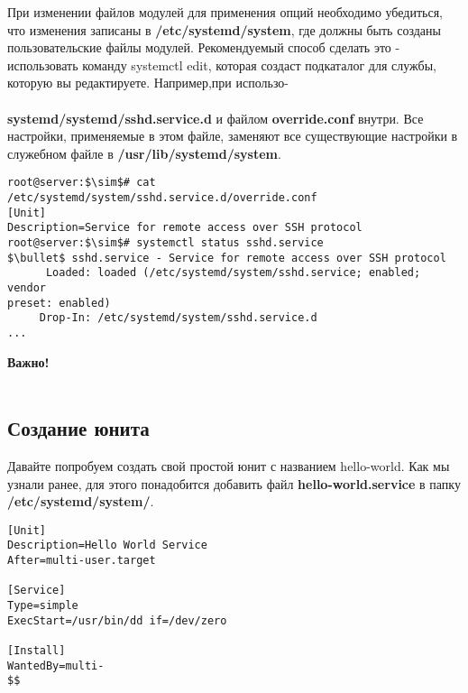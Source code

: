 \documentclass[14pt, a4paper]{article}
\begin{document}
\vspace{0.2cm}

При изменении файлов модулей для применения опций необходимо убедиться, что изменения
записаны в \textbf{/etc/systemd/system}, где должны быть созданы пользовательские файлы модулей.
Рекомендуемый способ сделать это - использовать команду \colorbox{backcolour}{systemctl edit}, которая создаст
подкаталог для службы, которую вы редактируете. Например,при использо- \\
\\
\textbf{systemd/systemd/sshd.service.d} и файлом
\textbf{override.conf} внутри. Все настройки, применяемые в этом файле, заменяют все существующие
настройки в служебном файле в \textbf{/usr/lib/systemd/system}.
\vspace{0.3cm}

\begin{lstlisting}
root@server:$\sim$# cat /etc/systemd/system/sshd.service.d/override.conf
[Unit]
Description=Service for remote access over SSH protocol
root@server:$\sim$# systemctl status sshd.service
$\bullet$ sshd.service - Service for remote access over SSH protocol
      Loaded: loaded (/etc/systemd/system/sshd.service; enabled; vendor 
preset: enabled)
     Drop-In: /etc/systemd/system/sshd.service.d
...
\end{lstlisting}
\vspace{0.2cm}

\textbf{Важно!}  \\
\\

\subsection*{Создание юнита} 

Давайте попробуем создать свой простой юнит с названием hello-world. Как мы узнали ранее, для
этого понадобится добавить файл \textbf{hello-world.service} в папку \textbf{/etc/systemd/system/}.
\vspace{0.3cm}

\begin{lstlisting}
[Unit]
Description=Hello World Service
After=multi-user.target

[Service]
Type=simple
ExecStart=/usr/bin/dd if=/dev/zero

[Install]
WantedBy=multi-
$$
\end{lstlisting}
\vspace{0.2cm}
\end{document}
